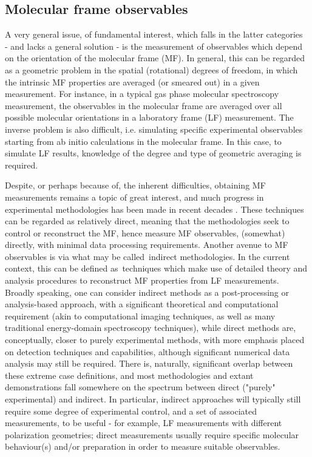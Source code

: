 \subsection{Molecular frame observables}

A very general issue, of fundamental interest, which falls in the latter categories  - and lacks a general solution - is the measurement of observables which depend on the orientation of the molecular frame (MF). In general, this can be regarded as a geometric problem in the spatial (rotational) degrees of freedom, in which the intrinsic MF properties are averaged (or smeared out) in a given measurement. For instance, in a typical gas phase molecular spectroscopy measurement, the observables in the molecular frame  are averaged over all possible molecular orientations in a laboratory frame (LF) measurement. The inverse problem is also difficult, i.e. simulating specific experimental observables starting from ab initio calculations in the molecular frame. In this case, to simulate LF results, knowledge of the degree and type of geometric averaging is required. 

Despite, or perhaps because of, the inherent difficulties, obtaining  MF measurements remains a topic of great interest, and much progress in experimental methodologies has been made in recent decades \cite{Reid2012, Yagishita2015} . These techniques can be regarded as relatively direct, meaning that the methodologies seek to control or reconstruct the MF, hence measure MF observables, (somewhat) directly, with minimal data processing requirements. Another avenue to MF observables is via what may be called indirect methodologies. In the current context, this can be defined as techniques which make use of detailed theory and analysis procedures to reconstruct MF properties from LF measurements. Broadly speaking, one can consider indirect methods as a post-processing or analysis-based approach, with a significant theoretical and computational requirement (akin to computational imaging techniques, as well as many traditional energy-domain spectroscopy techniques), while direct methods are, conceptually, closer to purely experimental methods, with more emphasis placed on detection techniques and capabilities, although significant numerical data analysis may still be required. There is, naturally, significant overlap between these extreme case definitions, and most methodologies and extant demonstrations fall somewhere on the spectrum between direct ("purely" experimental) and indirect. In particular, indirect approaches will typically still require some degree of experimental control, and a set of associated measurements, to be useful - for example, LF measurements with different polarization geometries; direct measurements usually require specific molecular behaviour(s) and/or preparation in order to measure suitable observables.